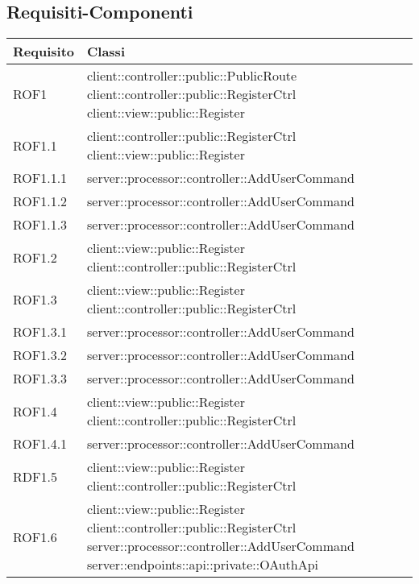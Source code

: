 \subsection{Requisiti-Componenti} %
\label{sub:componenti_requisiti}
\begin{center}
\def\arraystretch{1.5}
\bgroup
\begin{longtable}{| p{2.5cm} | p{11cm} |}
\hline
\textbf{Requisito} & \textbf{Classi} \\
\hline
ROF1 &  client::controller::public::PublicRoute \newline client::controller::public::RegisterCtrl \newline client::view::public::Register \\
\hline
ROF1.1 & client::controller::public::RegisterCtrl \newline client::view::public::Register \\
\hline
ROF1.1.1 & server::processor::controller::AddUserCommand \\
\hline
ROF1.1.2 & server::processor::controller::AddUserCommand \\
\hline
ROF1.1.3 & server::processor::controller::AddUserCommand \\
\hline
ROF1.2 & client::view::public::Register \newline client::controller::public::RegisterCtrl \\
\hline
ROF1.3 & client::view::public::Register \newline client::controller::public::RegisterCtrl \\
\hline
ROF1.3.1 & server::processor::controller::AddUserCommand \\
\hline
ROF1.3.2 & server::processor::controller::AddUserCommand \\
\hline
ROF1.3.3 & server::processor::controller::AddUserCommand \\
\hline
ROF1.4 & client::view::public::Register \newline client::controller::public::RegisterCtrl \\
\hline
ROF1.4.1 & server::processor::controller::AddUserCommand \\
\hline
RDF1.5 & client::view::public::Register \newline client::controller::public::RegisterCtrl \\
\hline
ROF1.6 & client::view::public::Register \newline client::controller::public::RegisterCtrl \newline server::processor::controller::AddUserCommand \newline server::endpoints::api::private::OAuthApi \\

\end{longtable}
\end{center}
